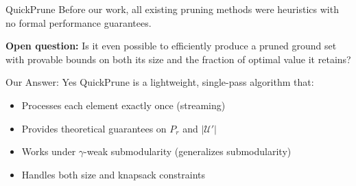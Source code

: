 \documentclass[aspectratio=169,xcolor=dvipsnames,8pt]{beamer}
\begin{document}
\begin{frame}{QuickPrune}
  Before our work, all existing pruning methods were heuristics with
  no formal performance guarantees.

  \vspace{0.3cm}

  \textbf{Open question:} Is it even possible to efficiently produce a pruned ground set
  with provable bounds on both its size and the fraction of optimal value it retains?

  \vspace{0.3cm}

  \begin{block}{Our Answer: Yes}
    QuickPrune is a lightweight, single-pass algorithm that:
    \begin{itemize}
      \item Processes each element exactly once (streaming)
      \item Provides theoretical guarantees on $P_r$ and $|\mathcal{U}'|$
      \item Works under $\gamma$-weak submodularity (generalizes submodularity)
      \item Handles both size and knapsack constraints
    \end{itemize}
  \end{block}
\end{frame}
\end{document}
